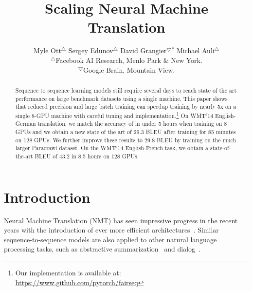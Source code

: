 \documentclass[11pt,a4paper]{article}
\title{Scaling Neural Machine Translation}
\author{%
Myle Ott$^\bigtriangleup$
\quad Sergey Edunov$^\bigtriangleup$
\quad David Grangier\hspace{1pt}$^\bigtriangledown$$^{*}$
\quad Michael Auli$^\bigtriangleup$
\\
$^\bigtriangleup$Facebook AI Research, Menlo Park \& New York. \quad \\
$^\bigtriangledown$Google Brain, Mountain View.
}
\date{}
\begin{document}
\maketitle

{\let\thefootnote\relax{}}

\begin{abstract}
Sequence to sequence learning models still require several days to reach state of the art performance on large benchmark datasets using a single machine. This paper 
shows that reduced precision and large batch training can speedup training by nearly 5x on a single 8-GPU machine with careful tuning and implementation.\footnote{Our implementation is available at:\\ 
\url{https://www.github.com/pytorch/fairseq}}
On WMT'14 English-German translation, we match the accuracy of \citet{vaswani2017transformer} in under 5 hours when training on 8 GPUs and we obtain a new state of the art of 29.3 BLEU after training for 85 minutes on 128 GPUs.
We further improve these results to 29.8 BLEU by training on the much larger Paracrawl dataset.
On the WMT'14 English-French task, we obtain a state-of-the-art BLEU of 43.2 in 8.5 hours on 128 GPUs.

\end{abstract}


\section{Introduction}

Neural Machine Translation (NMT) has seen impressive progress in the recent years with the introduction of ever more efficient architectures~\citep{bahdanau2015neural,gehring2017convs2s,vaswani2017transformer}. Similar sequence-to-sequence models are also applied to other natural language processing tasks, such as abstractive summarization~\citep{see2017acl,paulus2018iclr} and dialog~\citep{sordoni2015acl,serban2017AHL,dusek2016seq2seq}.
\end{document}
